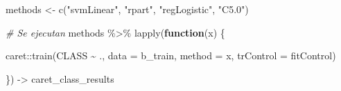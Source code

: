 \documentclass[
]{article}
\newenvironment{Shaded}{\begin{snugshade}}{\end{snugshade}}
\newcommand{\AttributeTok}[1]{\textcolor[rgb]{0.77,0.63,0.00}{#1}}
\newcommand{\CommentTok}[1]{\textcolor[rgb]{0.56,0.35,0.01}{\textit{#1}}}
\newcommand{\ControlFlowTok}[1]{\textcolor[rgb]{0.13,0.29,0.53}{\textbf{#1}}}
\newcommand{\FunctionTok}[1]{\textcolor[rgb]{0.00,0.00,0.00}{#1}}
\newcommand{\NormalTok}[1]{#1}
\newcommand{\OtherTok}[1]{\textcolor[rgb]{0.56,0.35,0.01}{#1}}
\newcommand{\SpecialCharTok}[1]{\textcolor[rgb]{0.00,0.00,0.00}{#1}}
\newcommand{\StringTok}[1]{\textcolor[rgb]{0.31,0.60,0.02}{#1}}
\begin{document}
\begin{Shaded}
\begin{Highlighting}[]
\NormalTok{methods }\OtherTok{\textless{}{-}} \FunctionTok{c}\NormalTok{(}\StringTok{"svmLinear"}\NormalTok{, }\StringTok{"rpart"}\NormalTok{, }\StringTok{"regLogistic"}\NormalTok{, }\StringTok{"C5.0"}\NormalTok{)}

\CommentTok{\# Se ejecutan}
\NormalTok{methods }\SpecialCharTok{\%\textgreater{}\%} 
  \FunctionTok{lapply}\NormalTok{(}\ControlFlowTok{function}\NormalTok{(x) \{}
    
\NormalTok{    caret}\SpecialCharTok{::}\FunctionTok{train}\NormalTok{(CLASS }\SpecialCharTok{\textasciitilde{}}\NormalTok{ ., }
                 \AttributeTok{data =}\NormalTok{ b\_train,}
                 \AttributeTok{method =}\NormalTok{ x,}
                 \AttributeTok{trControl =}\NormalTok{ fitControl)}
    
\NormalTok{  \}) }\OtherTok{{-}\textgreater{}}\NormalTok{ caret\_class\_results}
\end{Highlighting}
\end{Shaded}
\end{document}
